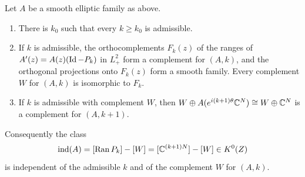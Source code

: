\begin{lemma}\label{bott:lem:index-bundle}
  Let $A$ be a smooth elliptic family as above.
  \begin{enumerate}[label=(\roman*)]
  \item There is $k_0$ such that every $k\ge k_0$ is admissible.
  \item If $k$ is admissible, the orthocomplements $F_k(z)$ of the ranges of
    $A'(z)=A(z)(\operatorname{Id}-P_k)$ in $L^2_+$ form a complement for $(A,k)$, and the orthogonal
    projections onto $F_k(z)$ form a smooth family. Every complement $W$ for $(A,k)$ is
    isomorphic to $F_k$.
  \item If $k$ is admissible with complement $W$, then
    $W\oplus A(e^{i(k+1)\theta}\mathbb{C}^N)\cong W\oplus\mathbb{C}^N$ is a complement for $(A,k+1)$.
  \end{enumerate}
  Consequently the class
  \begin{equation*}
    \operatorname{ind}(A)=[\operatorname{Ran} P_k]-[W]=[\mathbb{C}^{(k+1)N}]-[W]\in K^0(Z)
  \end{equation*}
  is independent of the admissible $k$ and of the complement $W$ for $(A,k)$.
\end{lemma}
